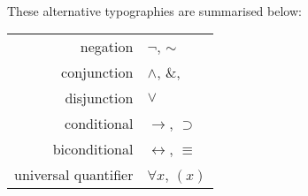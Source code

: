 \
\\These alternative typographies are summarised below:

\begin{center}
\begin{tabular}{rl}
negation & $\neg$, ${\sim}$\\
conjunction & $\wedge$, $\&$, {\scriptsize\textbullet}\\
disjunction & $\vee$\\
conditional & $\rightarrow$, $\supset$\\
biconditional & $\leftrightarrow$, $\equiv$\\
universal quantifier & $\forall x$, $(x)$
\end{tabular}
\end{center}


%
%
%
%
%
%
%
